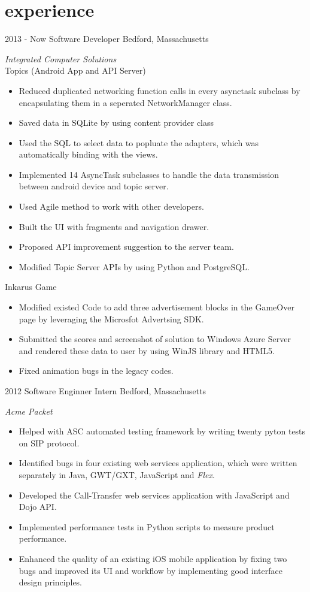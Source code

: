 \documentclass[]{ly-cv} %
\begin{document}
\section{experience}
\begin{entrylist}
\entry
{2013 - Now}
{Software Developer}
{Bedford, Massachusetts}
{\emph{Integrated Computer Solutions}\\
Topics (Android App and API Server)
\begin{itemize}
  \item Reduced duplicated networking function calls in every asynctask subclass by encapsulating them in a seperated NetworkManager class.
  \item Saved data in SQLite by using content provider class
  \item Used the SQL to select data to popluate the adapters, which was automatically binding with the views.
  \item Implemented 14 AsyncTask subclasses to handle the data transmission between android device and topic server.
  \item Used Agile method to work with other developers.
  \item Built the UI with fragments and navigation drawer.
  \item Proposed API improvement suggestion to the server team.
  \item Modified Topic Server APIs by using Python and PostgreSQL.
\end{itemize}

Inkarus Game
\begin{itemize}
  \item Modified existed Code to add three advertisement blocks in the GameOver page by leveraging the Microsfot Advertsing SDK.
  \item Submitted the scores and screenshot of solution to Windows Azure Server and rendered these data to user by using WinJS library and HTML5.
  \item Fixed animation bugs in the legacy codes.
\end{itemize}}
\entry
{2012}
{Software Enginner Intern}
{Bedford, Massachusetts}
{\emph{Acme Packet}
\begin{itemize}
  \item Helped with ASC automated testing framework by writing twenty pyton tests on SIP protocol.
	\item Identified bugs in four existing web services application, which were written separately in Java, GWT/GXT, JavaScript and \emph{Flex}.
  \item Developed the Call-Transfer web services application with JavaScript and Dojo API.
	\item Implemented performance tests in Python scripts to measure product performance.
  \item Enhanced the quality of an existing iOS mobile application by fixing two bugs and improved its UI and workflow by implementing good interface design principles.
\end{itemize}}
\end{entrylist}
\end{document}
